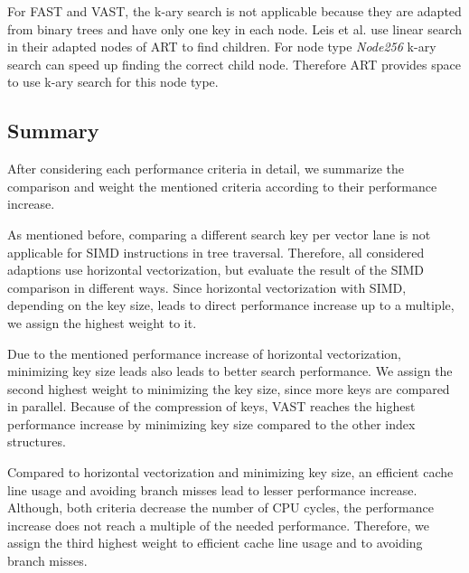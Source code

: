 \documentclass[conference]{IEEEtran}
\begin{document}
For FAST and VAST, the k-ary search is not applicable because they are adapted from binary trees and have only one key in each node. Leis et al. use linear search in their adapted nodes of ART to find children. For node type \emph{Node256} k-ary search can speed up finding the correct child node. Therefore ART provides space to use k-ary search for this node type.

\subsection{Summary}

After considering each performance criteria in detail, we summarize the comparison and weight the mentioned criteria according to their performance increase. 

As mentioned before, comparing a different search key per vector lane is not applicable for SIMD instructions in tree traversal. Therefore, all considered adaptions use horizontal vectorization, but evaluate the result of the SIMD comparison in different ways. Since horizontal vectorization with SIMD, depending on the key size, leads to direct performance increase up to a multiple, we assign the highest weight to it. 

Due to the mentioned performance increase of horizontal vectorization, minimizing key size leads also leads to better search performance. We assign the second highest weight to minimizing the key size, since more keys are compared in parallel. Because of the compression of keys, VAST reaches the highest performance increase by minimizing key size compared to the other index structures. 

Compared to horizontal vectorization and minimizing key size, an efficient cache line usage and avoiding branch misses lead to lesser performance increase. Although, both criteria decrease the number of CPU cycles, the performance increase does not reach a multiple of the needed performance. Therefore, we assign the third highest weight to efficient cache line usage and to avoiding branch misses.
\end{document}
